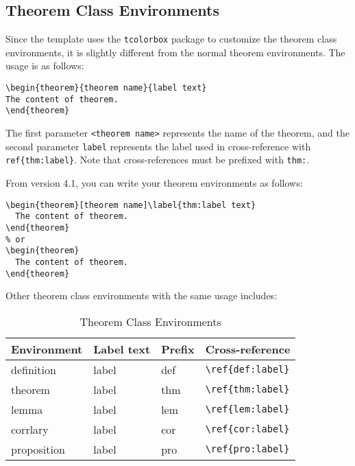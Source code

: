 \subsection{Theorem Class Environments}
Since the template uses the \lstinline{tcolorbox} package to customize the theorem class environments, it is slightly different from the normal theorem environments. The usage is as follows:
\begin{lstlisting}
\begin{theorem}{theorem name}{label text}
The content of theorem.
\end{theorem}
\end{lstlisting}

The first parameter \lstinline{<theorem name>} represents the name of the theorem, and the second parameter \lstinline{label} represents the label used in cross-reference with \verb|ref{thm:label}|. Note that cross-references must be prefixed with \lstinline{thm:}.

From version 4.1, you can write your theorem environments as follows:
\begin{lstlisting}
\begin{theorem}[theorem name]\label{thm:label text}
  The content of theorem.
\end{theorem}
% or
\begin{theorem}
  The content of theorem.
\end{theorem}
\end{lstlisting}

Other theorem class environments with the same usage includes:

\begin{table}[htbp]
    \centering
    \caption{Theorem Class Environments}
    \begin{tabular}{llll}
        \toprule
        Environment & Label text & Prefix & Cross-reference             \\
        \midrule
        definition  & label      & def    & \lstinline|\ref{def:label}| \\
        theorem     & label      & thm    & \lstinline|\ref{thm:label}| \\
        lemma       & label      & lem    & \lstinline|\ref{lem:label}| \\
        corrlary    & label      & cor    & \lstinline|\ref{cor:label}| \\
        proposition & label      & pro    & \lstinline|\ref{pro:label}| \\
        \bottomrule
    \end{tabular}%
    \label{tab:theorem-class}%
\end{table}%

